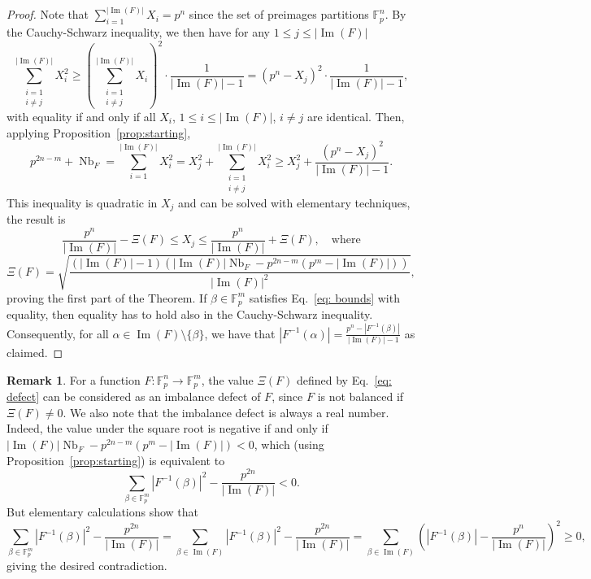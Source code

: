 \documentclass[11pt]{article}
\newcommand{\F}{\mathbb F}
\DeclareMathOperator{\Nb}{Nb}
\theoremstyle{plain}
\theoremstyle{definition}
\newtheorem{remark}[theorem]{Remark}
\numberwithin{theorem}{section}
\numberwithin{equation}{section}
\numberwithin{table}{section}
\numberwithin{figure}{section}
\DeclareMathOperator{\image}{Im}
\begin{document}
{\begin{proof}
   Note that $\sum_{i=1}^{|\image(F)|}X_i=p^n$ since the set of preimages partitions $\F_p^n$.
   By the Cauchy-Schwarz inequality, we  then have for any $1 \leq j \leq |\image(F)|$
   \[\sum_{\substack{i=1\\i\neq j}}^{|\image(F)|} X_i^2 \geq  \left(\sum_{\substack{i=1\\i\neq j}}^{|\image(F)|} X_i\right)^2 \cdot \frac{1}{|\image(F)|-1} = (p^n-X_j)^2\cdot \frac{1}{|\image(F)|-1},\]
		with equality if and only if all $X_i$, $1\leq i\leq |\image(F)|$, $i\neq j$ are identical. Then, applying Proposition~\ref{prop:starting},
		\[p^{2n-m} + \Nb_F=\sum_{i=1}^{|\image(F)|} X_i^2 =X_j^2+\sum_{\substack{i=1\\i\neq j}}^{|\image(F)|} X_i^2 \geq X_j^2+\frac{(p^n-X_j)^2}{|\image(F)|-1}.\]
		This inequality is quadratic in $X_j$ and can be solved with elementary techniques, the result is
  $$\frac{p^n}{|\image(F)|}-\Xi(F)\le X_j \le \frac{p^n}{|\image(F)|}+\Xi(F),\quad \mbox{where}$$
  $$\Xi(F)=\sqrt{\frac{(|\image(F)|-1)  \left( |\image(F)| \Nb_F -p^{2 n-m} \left(p^m-|\image(F)|\right)\right)}{|\image(F)|^2}},$$
  proving the first part of the Theorem. If $\beta \in  \F_p^m$ satisfies Eq.~\eqref{eq: bounds} with equality, then equality has to hold also in the Cauchy-Schwarz inequality.
  Consequently, for all $\alpha \in \image(F)\setminus\{\beta\}$, we have that  $|F^{-1}(\alpha)|=\frac{p^n-|F^{-1}(\beta)|}{|\image(F)|-1}$ as claimed.
\end{proof}

\begin{remark}
    For a function $F \colon \F_{p}^n \rightarrow \F_{p}^m$, the value $\Xi(F)$ defined by Eq.~\eqref{eq: defect} can be considered as an imbalance defect of $F$, since $F$ is not balanced if $\Xi(F)\neq0$. We also note that the imbalance defect is always a real number. Indeed, the value under the square root is negative if and only if $ |\image(F)| \Nb_F -p^{2 n-m} \left(p^m-|\image(F)|\right)<0$, which (using Proposition~\ref{prop:starting}) is equivalent to  
    \[\sum_{\beta \in \F_p^m}|F^{-1}(\beta)|^2-\frac{p^{2n}}{|\image(F)|}<0.\]
    But elementary calculations show that 
    \[\sum_{\beta \in \F_p^m}|F^{-1}(\beta)|^2-\frac{p^{2n}}{|\image(F)|} =  {\sum_{\beta \in \image(F)}|F^{-1}(\beta)|^2-\frac{p^{2n}}{|\image(F)|} =}\sum_{\beta \in  {\image(F)}}\left(|F^{-1}(\beta)|-\frac{p^n}{|\image(F)|}\right)^2 \geq 0,\]
    giving the desired contradiction.
\end{remark}

}
\end{document}
